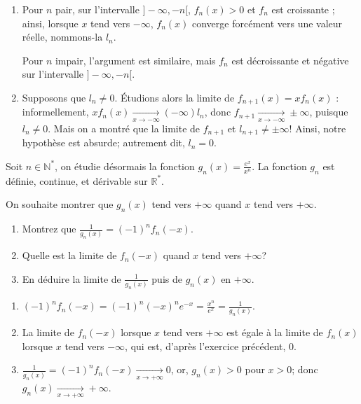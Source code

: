 \documentclass[a4paper,12pt]{exam}
\begin{document}
\begin{questions}
\begin{solution}
\begin{enumerate}
  \begin{center}
\end{center}
\item Pour $n$ pair, sur l'intervalle $]-\infty,-n[$, $f_n(x)>0$ et $f_n$ est croissante ; ainsi, lorsque $x$ tend vers $-\infty$, $f_n(x)$ converge forcément vers une valeur réelle, nommons-la $l_n$.

Pour $n$ impair, l'argument est similaire, mais $f_n$ est décroissante et négative sur l'intervalle $]-\infty,-n[$.
\item Supposons que $l_n\neq 0$. Étudions alors la limite de $f_{n+1}(x)=xf_n(x)$ : informellement, $xf_n(x)\xrightarrow[x\rightarrow-\infty]{}(-\infty)l_n$, donc $f_{n+1}\xrightarrow[x\rightarrow-\infty]{}\pm\infty$, puisque $l_n\neq 0$. Mais on a montré que la limite de $f_{n+1}$ et $l_{n+1}\neq\pm\infty$! Ainsi, notre hypothèse est absurde; autrement dit, $l_n=0$.
 \end{enumerate}
\end{solution}

Soit $n\in\mathbb N^*$, on étudie désormais la fonction $g_n(x)=\tfrac{e^x}{x^n}$. La fonction $g_n$ est définie, continue, et dérivable sur $\mathbb R^*$.

On souhaite montrer que $g_n(x)$ tend vers $+\infty$ quand $x$ tend vers $+\infty$.

\begin{enumerate}
 \item Montrez que $\tfrac1{g_n(x)}=(-1)^n f_n(-x)$.
 \item Quelle est la limite de $f_n(-x)$ quand $x$ tend vers $+\infty$?
 \item En déduire la limite de $\tfrac1{g_n(x)}$ puis de $g_n(x)$ en $+\infty$.
\end{enumerate}

\begin{solution}
 \begin{enumerate}
  \item $(-1)^nf_n(-x)=(-1)^n(-x)^ne^{-x}=\tfrac{x^n}{e^x}=\tfrac1{g_n(x)}$.
  \item La limite de $f_n(-x)$ lorsque $x$ tend vers $+\infty$ est égale à la limite de $f_n(x)$ lorsque $x$ tend vers $-\infty$, qui est, d'après l'exercice précédent, $0$.
  \item $\tfrac{1}{g_n(x)}=(-1)^nf_n(-x)\xrightarrow[x\rightarrow+\infty]{}0$, or, $g_n(x)>0$ pour $x>0$; donc $g_n(x)\xrightarrow[x\rightarrow+\infty]{}+\infty$.
 \end{enumerate}
\end{solution}



\end{questions}
\end{document}
